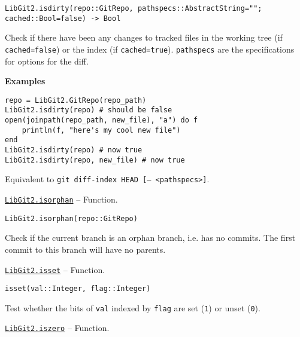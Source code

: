 \begin{adjustwidth}{2em}{0pt}


\begin{verbatim}
LibGit2.isdirty(repo::GitRepo, pathspecs::AbstractString=""; cached::Bool=false) -> Bool
\end{verbatim}

Check if there have been any changes to tracked files in the working tree (if \texttt{cached=false}) or the index (if \texttt{cached=true}). \texttt{pathspecs} are the specifications for options for the diff.

\textbf{Examples}


\begin{verbatim}
repo = LibGit2.GitRepo(repo_path)
LibGit2.isdirty(repo) # should be false
open(joinpath(repo_path, new_file), "a") do f
    println(f, "here's my cool new file")
end
LibGit2.isdirty(repo) # now true
LibGit2.isdirty(repo, new_file) # now true
\end{verbatim}

Equivalent to \texttt{git diff-index HEAD [-- <pathspecs>]}.



\end{adjustwidth}
\hypertarget{2361675915882834215}{}
\hyperlink{2361675915882834215}{\texttt{LibGit2.isorphan}}  -- {Function.}

\begin{adjustwidth}{2em}{0pt}


\begin{verbatim}
LibGit2.isorphan(repo::GitRepo)
\end{verbatim}

Check if the current branch is an {\textquotedbl}orphan{\textquotedbl} branch, i.e. has no commits. The first commit to this branch will have no parents.



\end{adjustwidth}
\hypertarget{2310531182237663864}{}
\hyperlink{2310531182237663864}{\texttt{LibGit2.isset}}  -- {Function.}

\begin{adjustwidth}{2em}{0pt}


\begin{verbatim}
isset(val::Integer, flag::Integer)
\end{verbatim}

Test whether the bits of \texttt{val} indexed by \texttt{flag} are set (\texttt{1}) or unset (\texttt{0}).



\end{adjustwidth}
\hypertarget{12794222535204600786}{}
\hyperlink{12794222535204600786}{\texttt{LibGit2.iszero}}  -- {Function.}

